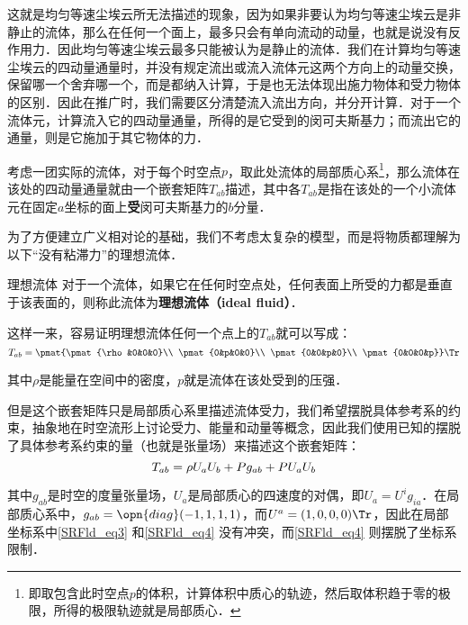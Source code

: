 这就是均匀等速尘埃云所无法描述的现象，因为如果非要认为均匀等速尘埃云是非静止的流体，那么在任何一个面上，最多只会有单向流动的动量，也就是说没有反作用力．因此均匀等速尘埃云最多只能被认为是静止的流体．我们在计算均匀等速尘埃云的四动量通量时，并没有规定流出或流入流体元这两个方向上的动量交换，保留哪一个舍弃哪一个，而是都纳入计算，于是也无法体现出施力物体和受力物体的区别．因此在推广时，我们需要区分清楚流入流出方向，并分开计算．对于一个流体元，计算流入它的四动量通量，所得的是它受到的闵可夫斯基力；而流出它的通量，则是它施加于其它物体的力．

\begin{definition}{}
考虑一团实际的流体，对于每个时空点$p$，取此处流体的局部质心系\footnote{即取包含此时空点$p$的体积，计算体积中质心的轨迹，然后取体积趋于零的极限，所得的极限轨迹就是局部质心．}，那么流体在该处的四动量通量就由一个嵌套矩阵$T_{ab}$描述，其中各$T_{ab}$是指在该处的一个小流体元在固定$a$坐标的面上\textbf{受}闵可夫斯基力的$b$分量．
\end{definition}


为了方便建立广义相对论的基础，我们不考虑太复杂的模型，而是将物质都理解为以下“没有粘滞力”的理想流体．


\begin{definition}{理想流体}
对于一个流体，如果它在任何时空点处，任何表面上所受的力都是垂直于该表面的，则称此流体为\textbf{理想流体（ideal fluid）}．
\end{definition}

这样一来，容易证明理想流体任何一个点上的$T_{ab}$就可以写成：
\begin{equation}\label{SRFld_eq3}
T_{ab}=\pmat{\pmat{\rho&0&0&0}\\
\pmat{0&p&0&0}\\
\pmat{0&0&p&0}\\
\pmat{0&0&0&p}}\Tr
\end{equation}

其中$\rho$是能量在空间中的密度，$p$就是流体在该处受到的压强．

但是这个嵌套矩阵只是局部质心系里描述流体受力，我们希望摆脱具体参考系的约束，抽象地在时空流形上讨论受力、能量和动量等概念，因此我们使用已知的摆脱了具体参考系约束的量（也就是张量场）来描述这个嵌套矩阵：
\begin{equation}\label{SRFld_eq4}
T_{ab}=\rho U_aU_b+P g_{ab}+P U_aU_b\\
\end{equation}

其中$g_{ab}$是时空的度量张量场，$U_a$是局部质心的四速度的对偶，即$U_a=U^ig_{ia}$．在局部质心系中，$g_{ab}=\opn{diag}(-1, 1, 1, 1)$，而$U^{a}=(1, 0, 0 ,0)\Tr$，因此在局部坐标系中\autoref{SRFld_eq3} 和\autoref{SRFld_eq4} 没有冲突，而\autoref{SRFld_eq4} 则摆脱了坐标系限制．

